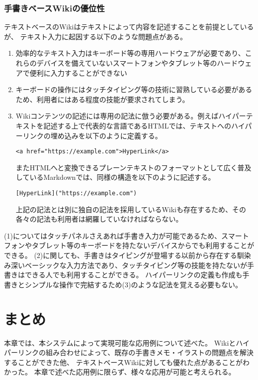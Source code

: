 \subsubsection{手書きベースWikiの優位性}
テキストベースのWikiはテキストによって内容を記述することを前提としているが、
テキスト入力に起因する以下のような問題点がある。
\begin{enumerate}
    \item 効率的なテキスト入力はキーボード等の専用ハードウェアが必要であり、これらのデバイスを備えていないスマートフォンやタブレット等のハードウェアで便利に入力することができない
    \item キーボードの操作にはタッチタイピング等の技術に習熟している必要があるため、利用者にはある程度の技能が要求されてしまう。
    \item Wikiコンテンツの記述には専用の記法に倣う必要がある。例えばハイパーテキストを記述する上で代表的な言語であるHTMLでは、テキストへのハイパーリンクの埋め込みを以下のように定義する。
    \begin{lstlisting}[caption=htmlにおけるハイパーリンクの定義, label=htmlhyperlinking]
        <a href="https://example.com">HyperLink</a>
    \end{lstlisting}
    またHTMLへと変換できるプレーンテキストのフォーマットとして広く普及しているMarkdownでは、同様の構造を以下のように記述する。
    \begin{lstlisting}[caption=htmlにおけるハイパーリンクの定義, label=mdhyperlinking]
        [HyperLink]("https://example.com")
    \end{lstlisting}
    上記の記法とは別に独自の記法を採用しているWikiも存在するため、その各々の記法も利用者は網羅していなければならない。
\end{enumerate}

(1)についてはタッチパネルさえあれば手書き入力が可能であるため、スマートフォンやタブレット等のキーボードを持たないデバイスからでも利用することができる。
(2)に関しても、手書きはタイピングが登場する以前から存在する馴染み深いベーシックな入力方法であり、タッチタイピング等の技能を持たないが手書きはできる人でも利用することができる。
ハイパーリンクの定義も作成も手書きとシンプルな操作で完結するため(3)のような記法を覚える必要もない。

\section{まとめ}
本章では、本システムによって実現可能な応用例について述べた。
Wikiとハイパーリンクの組み合わせによって、既存の手書きメモ・イラストの問題点を解決することができた他、
テキストベースWikiに対しても優れた点があることがわかった。
本章で述べた応用例に限らず、様々な応用が可能と考えられる。